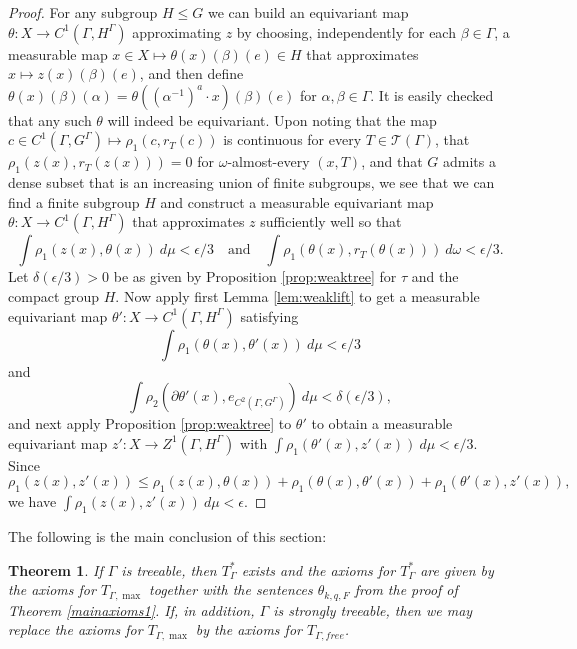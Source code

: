 \documentclass[12pt]{amsart}
\newtheorem{thm}{Theorem}[section]
\theoremstyle{definition}
\def\cal{\mathcal}
\begin{document}
\begin{proof}
	For any subgroup $H \leq G$ we can build an equivariant map $\theta : X \rightarrow C^1(\Gamma, H^\Gamma)$ approximating $z$ by choosing, independently for each $\beta \in \Gamma$, a measurable map $x \in X \mapsto \theta(x)(\beta)(e) \in H$ that approximates $x \mapsto z(x)(\beta)(e)$, and then define $\theta(x)(\beta)(\alpha) = \theta((\alpha^{-1})^a \cdot x)(\beta)(e)$ for $\alpha, \beta \in \Gamma$. It is easily checked that any such $\theta$ will indeed be equivariant. Upon noting that the map $c \in C^1(\Gamma, G^\Gamma) \mapsto \rho_1(c, r_T(c))$ is continuous for every $T \in \cal T(\Gamma)$, that $\rho_1(z(x), r_T(z(x))) = 0$ for $\omega$-almost-every $(x,T)$, and that $G$ admits a dense subset that is an increasing union of finite subgroups, we see that we can find a finite subgroup $H$ and construct a measurable equivariant map $\theta : X \rightarrow C^1(\Gamma, H^\Gamma)$ that approximates $z$ sufficiently well so that
	\[\int \rho_1(z(x), \theta(x)) \ d \mu < \epsilon / 3 \quad \text{and} \quad \int \rho_1(\theta(x), r_T(\theta(x))) \ d \omega < \epsilon / 3.\]
	Let $\delta(\epsilon/3) > 0$ be as given by Proposition \ref{prop:weaktree} for $\tau$ and the compact group $H$. Now apply first Lemma \ref{lem:weaklift} to get a measurable equivariant map $\theta' : X \rightarrow C^1(\Gamma, H^\Gamma)$ satisfying
	\[\int \rho_1(\theta(x), \theta'(x)) \ d \mu < \epsilon/3\]
	and
	\[\int \rho_2(\partial \theta'(x), e_{C^2(\Gamma, G^\Gamma)}) \ d \mu < \delta(\epsilon/3),\]
	and next apply Proposition \ref{prop:weaktree} to $\theta'$ to obtain a measurable equivariant map $z' : X \rightarrow Z^1(\Gamma, H^\Gamma)$ with $\int \rho_1(\theta'(x), z'(x)) \ d \mu < \epsilon / 3$. Since
	\[\rho_1(z(x),z'(x)) \leq \rho_1(z(x), \theta(x)) + \rho_1(\theta(x), \theta'(x)) + \rho_1(\theta'(x), z'(x)),\]
	we have $\int \rho_1(z(x), z'(x)) \ d \mu < \epsilon$.
\end{proof}

The following is the main conclusion of this section:

\begin{thm}\label{treeableecchar}
    If $\Gamma$ is treeable, then $T_\Gamma^*$ exists and the axioms for $T_\Gamma^*$ are given by the axioms for $T_{\Gamma,\max}$ together with the sentences $\theta_{k,q,F}$ from the proof of Theorem \ref{mainaxioms1}. If, in addition, $\Gamma$ is strongly treeable, then we may replace the axioms for $T_{\Gamma,\max}$ by the axioms for $T_{\Gamma,free}$. 
\end{thm}
\end{document}
